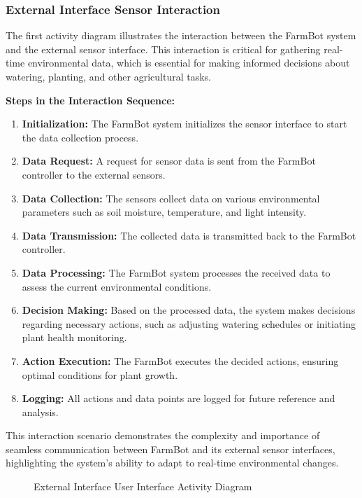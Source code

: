\subsubsection{External Interface Sensor Interaction}

The first activity diagram illustrates the interaction between the FarmBot system and the external sensor interface. This interaction is critical for gathering real-time environmental data, which is essential for making informed decisions about watering, planting, and other agricultural tasks.

\textbf{Steps in the Interaction Sequence:}
\begin{enumerate}
    \item \textbf{Initialization:} The FarmBot system initializes the sensor interface to start the data collection process.
    \item \textbf{Data Request:} A request for sensor data is sent from the FarmBot controller to the external sensors.
    \item \textbf{Data Collection:} The sensors collect data on various environmental parameters such as soil moisture, temperature, and light intensity.
    \item \textbf{Data Transmission:} The collected data is transmitted back to the FarmBot controller.
    \item \textbf{Data Processing:} The FarmBot system processes the received data to assess the current environmental conditions.
    \item \textbf{Decision Making:} Based on the processed data, the system makes decisions regarding necessary actions, such as adjusting watering schedules or initiating plant health monitoring.
    \item \textbf{Action Execution:} The FarmBot executes the decided actions, ensuring optimal conditions for plant growth.
    \item \textbf{Logging:} All actions and data points are logged for future reference and analysis.
\end{enumerate}

This interaction scenario demonstrates the complexity and importance of seamless communication between FarmBot and its external sensor interfaces, highlighting the system's ability to adapt to real-time environmental changes.

\begin{figure}[H]
    \centering
    
    \caption{External Interface User Interface Activity Diagram}
\end{figure}

